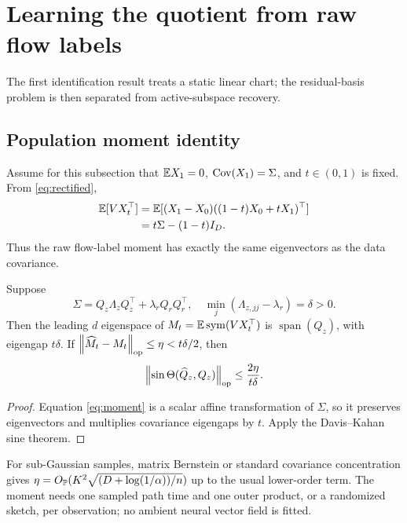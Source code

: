 \section{Learning the quotient from raw flow labels}

The first identification result treats a static linear chart; the residual-basis problem is then separated from active-subspace recovery.

\subsection{Population moment identity}

Assume for this subsection that $\mathbb E X_1=0$, $\operatorname{Cov}(X_1)=\Sigma$, and $t\in(0,1)$ is fixed.  From \eqref{eq:rectified},
\begin{align}
 \mathbb E[VX_t^\top]
 &=\mathbb E[(X_1-X_0)((1-t)X_0+tX_1)^\top]\nonumber\\
 &=t\Sigma-(1-t)I_D.
 \label{eq:moment}
\end{align}
Thus the raw flow-label moment has exactly the same eigenvectors as the data covariance.

\begin{theorem}
Suppose
\begin{equation}
 \Sigma=Q_z\Lambda_zQ_z^\top+\lambda_r Q_rQ_r^\top,
 \quad \min_j(\Lambda_{z,jj}-\lambda_r)=\delta>0.
 \label{eq:spike}
\end{equation}
Then the leading $d$ eigenspace of $M_t=\mathbb E\operatorname{sym}(VX_t^\top)$ is $\operatorname{span}(Q_z)$, with eigengap $t\delta$.  If $\left\lVert \widehat M_t-M_t\right\rVert_{\mathrm{op}}\le\eta<t\delta/2$, then
\begin{equation}
 \left\lVert \sin\Theta(\widehat Q_z,Q_z)\right\rVert_{\mathrm{op}}
 \le\frac{2\eta}{t\delta}.
 \label{eq:dk}
\end{equation}
\end{theorem}
\begin{proof}
Equation \eqref{eq:moment} is a scalar affine transformation of $\Sigma$, so it preserves eigenvectors and multiplies covariance eigengaps by $t$.  Apply the Davis--Kahan sine theorem.
\end{proof}

For sub-Gaussian samples, matrix Bernstein or standard covariance concentration gives $\eta=O_{\mathbb P}(K^2\sqrt{(D+\log(1/\alpha))/n})$ up to the usual lower-order term.  The moment needs one sampled path time and one outer product, or a randomized sketch, per observation; no ambient neural vector field is fitted.

